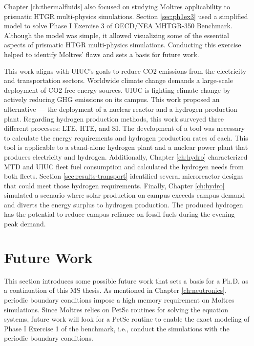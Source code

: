 Chapter \ref{ch:thermalfluids} also focused on studying Moltres applicability to prismatic HTGR multi-physics simulations.
Section \ref{sec:ph1ex3} used a simplified model to solve Phase I Exercise 3 of OECD/NEA MHTGR-350 Benchmark.
Although the model was simple, it allowed visualizing some of the essential aspects of prismatic HTGR multi-physics simulations.
Conducting this exercise helped to identify Moltres' flaws and sets a basis for future work.

This work aligns with UIUC's goals to reduce \gls{CO2} emissions from the electricity and transportation sectors.
Worldwide climate change demands a large-scale deployment of \gls{CO2}-free energy sources.
UIUC is fighting climate change by actively reducing GHG emissions on its campus.
This work proposed an alternative --- the deployment of a nuclear reactor and a hydrogen production plant.
Regarding hydrogen production methods, this work surveyed three different processes: LTE, HTE, and SI.
The development of a tool was necessary to calculate the energy requirements and hydrogen production rates of each.
This tool is applicable to a stand-alone hydrogen plant and a nuclear power plant that produces electricity and hydrogen.
Additionally, Chapter \ref{ch:hydro} characterized MTD and UIUC fleet fuel consumption and calculated the hydrogen needs from both fleets.
Section \ref{sec:results-transport} identified several microreactor designs that could meet those hydrogen requirements.
Finally, Chapter \ref{ch:hydro} simulated a scenario where solar production on campus exceeds campus demand and diverts the energy surplus to hydrogen production.
The produced hydrogen has the potential to reduce campus reliance on fossil fuels during the evening peak demand.

\section{Future Work}
\label{sec:futwork}

This section introduces some possible future work that sets a basis for a Ph.D. as a continuation of this MS thesis.
As mentioned in Chapter \ref{ch:neutronics}, periodic boundary conditions impose a high memory requirement on Moltres simulations.
Since Moltres relies on PetSc routines for solving the equation systems, future work will look for a PetSc routine to enable the exact modeling of Phase I Exercise 1 of the benchmark, i.e., conduct the simulations with the periodic boundary conditions.

